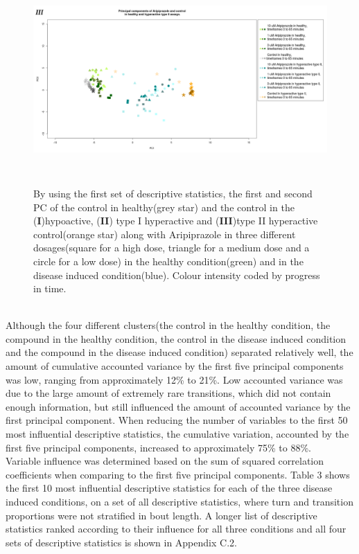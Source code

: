 \documentclass[a4paper,12pt]{article}
\begin{document}
\begin{figure}[h!]
\begin{center}
\includegraphics[width=16cm,height=8cm]{Aripiprazole_Control_DarkPTZ.png}
\caption{By using the first set of descriptive statistics, the first and second PC of the control in healthy(grey star) and the control in the (\textbf{I})hypoactive, (\textbf{II}) type I hyperactive and (\textbf{III})type II hyperactive control(orange star) along with Aripiprazole in three different dosages(square for a high dose, triangle for a medium dose and a circle for a low dose) in the healthy condition(green) and in the disease induced condition(blue). Colour intensity coded by progress in time.}
\end{center}
\end{figure}
\\Although the four different clusters(the control in the healthy condition, the compound in the healthy condition, the control in the disease induced condition and the compound in the disease induced condition) separated relatively well, the amount of cumulative accounted variance by the first five principal components was low, ranging from approximately 12\% to 21\%. Low accounted variance was due to the large amount of extremely rare transitions, which did not contain enough information, but still influenced the amount of accounted variance by the first principal component. When reducing the number of variables to the first 50 most influential descriptive statistics, the cumulative variation, accounted by the first five principal components, increased to approximately 75\% to 88\%.
\\Variable influence was determined based on the sum of squared correlation coefficients when comparing to the first five principal components. Table 3 shows the first 10 most influential descriptive statistics for each of the three disease induced conditions, on a set of all descriptive statistics, where turn and transition proportions were not stratified in bout length. A longer list of descriptive statistics ranked according to their influence for all three conditions and all four sets of descriptive statistics is shown in Appendix C.2. 
\end{document}
